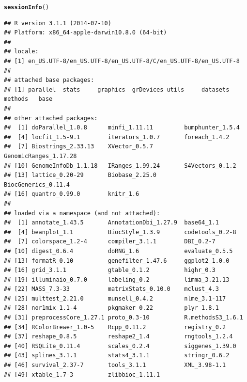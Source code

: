\documentclass{article}\usepackage[]{graphicx}\usepackage[usenames,dvipsnames]{color}
\makeatletter
\newcommand{\hlstd}[1]{\textcolor[rgb]{0.345,0.345,0.345}{#1}}%
\newcommand{\hlkwd}[1]{\textcolor[rgb]{0.737,0.353,0.396}{\textbf{#1}}}%
\newenvironment{kframe}{%
 \def\at@end@of@kframe{}%
 \ifinner\ifhmode%
  \def\at@end@of@kframe{\end{minipage}}%
  \begin{minipage}{\columnwidth}%
 \fi\fi%
 \def\FrameCommand##1{\hskip\@totalleftmargin \hskip-\fboxsep
 \colorbox{shadecolor}{##1}\hskip-\fboxsep
     \hskip-\linewidth \hskip-\@totalleftmargin \hskip\columnwidth}%
 \MakeFramed {\advance\hsize-\width
   \@totalleftmargin\z@ \linewidth\hsize
   \@setminipage}}%
 {\par\unskip\endMakeFramed%
 \at@end@of@kframe}
\newenvironment{knitrout}{}{} %
\makeatother
\begin{document}
\begin{knitrout}
\color{fgcolor}\begin{kframe}
\begin{alltt}
\hlkwd{sessionInfo}\hlstd{()}
\end{alltt}
\begin{verbatim}
## R version 3.1.1 (2014-07-10)
## Platform: x86_64-apple-darwin10.8.0 (64-bit)
## 
## locale:
## [1] en_US.UTF-8/en_US.UTF-8/en_US.UTF-8/C/en_US.UTF-8/en_US.UTF-8
## 
## attached base packages:
## [1] parallel  stats     graphics  grDevices utils     datasets  methods   base     
## 
## other attached packages:
##  [1] doParallel_1.0.8      minfi_1.11.11         bumphunter_1.5.4     
##  [4] locfit_1.5-9.1        iterators_1.0.7       foreach_1.4.2        
##  [7] Biostrings_2.33.13    XVector_0.5.7         GenomicRanges_1.17.28
## [10] GenomeInfoDb_1.1.18   IRanges_1.99.24       S4Vectors_0.1.2      
## [13] lattice_0.20-29       Biobase_2.25.0        BiocGenerics_0.11.4  
## [16] quantro_0.99.0        knitr_1.6            
## 
## loaded via a namespace (and not attached):
##  [1] annotate_1.43.5       AnnotationDbi_1.27.9  base64_1.1           
##  [4] beanplot_1.1          BiocStyle_1.3.9       codetools_0.2-8      
##  [7] colorspace_1.2-4      compiler_3.1.1        DBI_0.2-7            
## [10] digest_0.6.4          doRNG_1.6             evaluate_0.5.5       
## [13] formatR_0.10          genefilter_1.47.6     ggplot2_1.0.0        
## [16] grid_3.1.1            gtable_0.1.2          highr_0.3            
## [19] illuminaio_0.7.0      labeling_0.2          limma_3.21.13        
## [22] MASS_7.3-33           matrixStats_0.10.0    mclust_4.3           
## [25] multtest_2.21.0       munsell_0.4.2         nlme_3.1-117         
## [28] nor1mix_1.1-4         pkgmaker_0.22         plyr_1.8.1           
## [31] preprocessCore_1.27.1 proto_0.3-10          R.methodsS3_1.6.1    
## [34] RColorBrewer_1.0-5    Rcpp_0.11.2           registry_0.2         
## [37] reshape_0.8.5         reshape2_1.4          rngtools_1.2.4       
## [40] RSQLite_0.11.4        scales_0.2.4          siggenes_1.39.0      
## [43] splines_3.1.1         stats4_3.1.1          stringr_0.6.2        
## [46] survival_2.37-7       tools_3.1.1           XML_3.98-1.1         
## [49] xtable_1.7-3          zlibbioc_1.11.1
\end{verbatim}
\end{kframe}
\end{knitrout}



\end{document}
